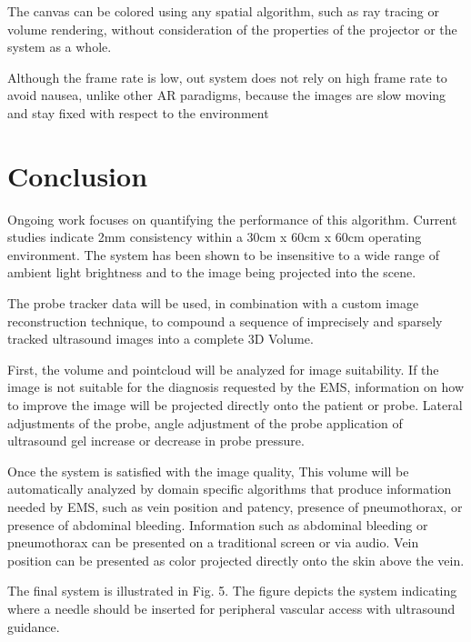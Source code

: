 \documentclass{llncs}
\begin{document}
The canvas can be colored using any spatial algorithm, such as ray tracing or volume rendering, without consideration of the properties of the projector or the system as a whole.

Although the frame rate is low, out system does not rely on high frame rate to avoid nausea, unlike other AR paradigms, because the images are slow moving and stay fixed with respect to the environment 

\section{Conclusion}
Ongoing work focuses on quantifying the performance of this algorithm.  Current studies indicate 2mm consistency within a 30cm x 60cm x 60cm operating environment.  The system has been shown to be insensitive to a wide range of ambient light brightness and to the image being projected into the scene.

The probe tracker data will be used, in combination with a custom image reconstruction technique, to compound a sequence of imprecisely and sparsely tracked ultrasound images into a complete 3D Volume.

First, the volume and pointcloud will be analyzed for image suitability. If the image is not suitable for the diagnosis requested by the EMS, information on how to improve the image will be projected directly onto the patient or probe. Lateral adjustments of the probe,
angle adjustment of the probe
application of ultrasound gel
increase or decrease in probe pressure.

Once the system is satisfied with the image quality, This volume will be automatically analyzed by domain specific algorithms that produce information needed by EMS, such as vein position and patency, presence of pneumothorax, or presence of abdominal bleeding. Information such as abdominal bleeding or pneumothorax can be presented on a traditional screen or via audio. Vein position can be presented as color projected directly onto the skin above the vein.

The final system is illustrated in Fig. 5.  The figure depicts the system indicating where a needle should be inserted for peripheral vascular access with ultrasound guidance.
\end{document}
